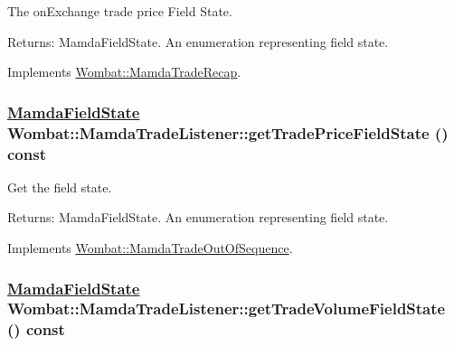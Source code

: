 The on\-Exchange trade price Field State. 

\begin{Desc}
\item[Returns:]Mamda\-Field\-State. An enumeration representing field state. \end{Desc}


Implements \hyperlink{classWombat_1_1MamdaTradeRecap_f64ddeb0f184484bab7fcb380995b6a5}{Wombat::Mamda\-Trade\-Recap}.\hypertarget{classWombat_1_1MamdaTradeListener_f1dc31d1863ca41868f8b4a384c7ac46}{
\subsubsection[getTradePriceFieldState]{\setlength{\rightskip}{0pt plus 5cm}\hyperlink{namespaceWombat_93aac974f2ab713554fd12a1fa3b7d2a}{Mamda\-Field\-State} Wombat::Mamda\-Trade\-Listener::get\-Trade\-Price\-Field\-State () const}}
\label{classWombat_1_1MamdaTradeListener_f1dc31d1863ca41868f8b4a384c7ac46}


Get the field state. 

\begin{Desc}
\item[Returns:]Mamda\-Field\-State. An enumeration representing field state. \end{Desc}


Implements \hyperlink{classWombat_1_1MamdaTradeOutOfSequence_7ff7270f7dca5635214db31cd5c43ff6}{Wombat::Mamda\-Trade\-Out\-Of\-Sequence}.\hypertarget{classWombat_1_1MamdaTradeListener_5fa909b1c87c6380e204dba43ab9baa7}{
\subsubsection[getTradeVolumeFieldState]{\setlength{\rightskip}{0pt plus 5cm}\hyperlink{namespaceWombat_93aac974f2ab713554fd12a1fa3b7d2a}{Mamda\-Field\-State} Wombat::Mamda\-Trade\-Listener::get\-Trade\-Volume\-Field\-State () const}}
\label{classWombat_1_1MamdaTradeListener_5fa909b1c87c6380e204dba43ab9baa7}


